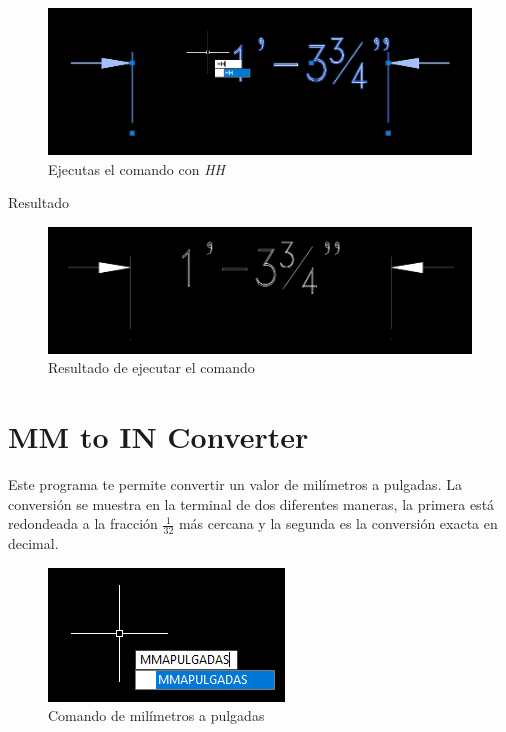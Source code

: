 \documentclass[12pt,letterpaper,final]{report}
\begin{document}
\begin{figure}[H]
	\centering
	\includegraphics[width=0.65\linewidth, height=0.5\textheight,keepaspectratio]{Imagenes/autocad_dimedithome_02}
	\caption{Ejecutas el comando con \emph{HH}}
	\label{fig:autocaddimedithome02}
\end{figure}

{\LARGE Resultado}

\begin{figure}[H]
	\centering
	\includegraphics[width=0.65\linewidth, height=0.5\textheight,keepaspectratio]{Imagenes/autocad_dimedithome_03}
	\caption{Resultado de ejecutar el comando}
	\label{fig:autocaddimedithome03}
\end{figure}

\section{MM to IN Converter}

Este programa te permite convertir un valor de milímetros a pulgadas. La conversión se muestra en la terminal de dos diferentes maneras, la primera está redondeada a la fracción $\tfrac{1}{32}$ más cercana y la segunda es la conversión exacta en decimal.

\begin{figure}[H]
	\centering
	\includegraphics[width=0.65\linewidth, height=0.5\textheight,keepaspectratio]{Imagenes/autocad_mmapulgadas_01}
	\caption{Comando de milímetros a pulgadas}
	\label{fig:autocadmmapulgadas01}
\end{figure}
\end{document}
